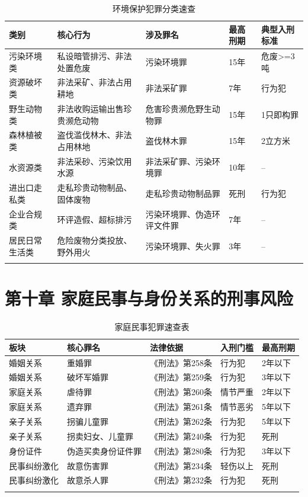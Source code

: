 \documentclass[12pt,a4paper]{article}
\begin{document}
\begin{longtable}{p{2cm}p{3cm}p{4cm}p{2cm}p{2cm}}
  \toprule
  \textbf{类别} & \textbf{核心行为} & \textbf{涉及罪名} & \textbf{最高刑期} & \textbf{典型入刑标准} \\
  \midrule
  污染环境类 & 私设暗管排污、非法处置危废 & 污染环境罪 & 15年 & 危废>=3吨 \\
  资源破坏类 & 非法采矿、非法占用耕地 & 非法采矿罪 & 7年 & 行为犯 \\
  野生动物类 & 非法收购运输出售珍贵濒危动物 & 危害珍贵濒危野生动物罪 & 15年 & 1只即构罪 \\
  森林植被类 & 盗伐滥伐林木、非法占用林地 & 盗伐林木罪 & 15年 & 2立方米 \\
  水资源类 & 非法采砂、污染饮用水源 & 非法采矿罪、污染环境罪 & 10年 & -- \\
  进出口走私类 & 走私珍贵动物制品、固体废物 & 走私珍贵动物制品罪 & 死刑 & 行为犯 \\
  企业合规类 & 环评造假、超标排污 & 污染环境罪、伪造环评文件罪 & 7年 & -- \\
  居民日常生活类 & 危险废物分类投放、野外用火 & 污染环境罪、失火罪 & 3年 & -- \\
  \bottomrule
  \caption{环境保护犯罪分类速查}
\end{longtable}

\clearpage

\section{第十章 家庭民事与身份关系的刑事风险}

\begin{longtable}{p{2cm}p{4cm}p{3cm}p{3cm}p{2cm}}
  \toprule
  \textbf{板块} & \textbf{核心罪名} & \textbf{法律依据} & \textbf{入刑门槛} & \textbf{最高刑期} \\
  \midrule
  婚姻关系 & 重婚罪 & 《刑法》第258条 & 行为犯 & 2年以下 \\
  婚姻关系 & 破坏军婚罪 & 《刑法》第259条 & 行为犯 & 3年以下 \\
  家庭关系 & 虐待罪 & 《刑法》第260条 & 情节严重 & 2年以下 \\
  家庭关系 & 遗弃罪 & 《刑法》第261条 & 情节恶劣 & 5年以下 \\
  亲子关系 & 拐骗儿童罪 & 《刑法》第262条 & 行为犯 & 5年以下 \\
  亲子关系 & 拐卖妇女、儿童罪 & 《刑法》第240条 & 行为犯 & 死刑 \\
  身份证件 & 伪造买卖身份证件罪 & 《刑法》第280条 & 行为犯 & 3年以下 \\
  民事纠纷激化 & 故意伤害罪 & 《刑法》第234条 & 轻伤以上 & 死刑 \\
  民事纠纷激化 & 故意杀人罪 & 《刑法》第232条 & 行为犯 & 死刑 \\
  \bottomrule
  \caption{家庭民事犯罪速查表}
\end{longtable}
\end{document}
